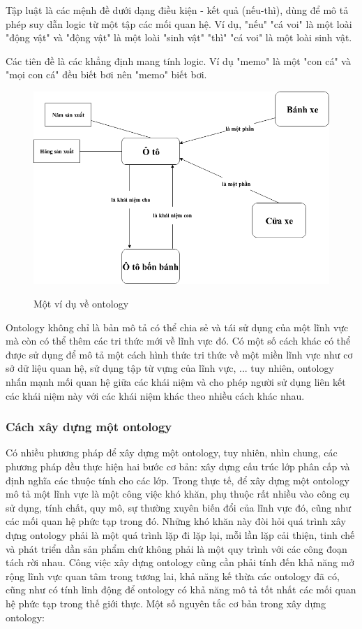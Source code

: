 Tập luật  là các mệnh đề dưới dạng điều kiện - kết quả (nếu-thì), dùng để mô tả phép suy dẫn logic từ một tập các mối quan hệ. Ví dụ, "nếu" "cá voi" là một loài "động vật"  và "động vật" là một loài "sinh vật" "thì" "cá voi" là một loài sinh vật.

Các tiên đề là các khẳng định mang tính logic. Ví dụ "memo" là một "con cá" và "mọi con cá" đều biết bơi nên "memo" biết bơi. 

\clearpage
\begin{figure}
	\center
	\includegraphics[scale=0.6]{image/otology_example}
	\label{fig:ontology}
	\caption{Một ví dụ về ontology}
\end{figure}


Ontology không chỉ là bản mô tả có thể chia sẻ và tái sử dụng của một lĩnh vực mà còn có thể thêm các tri thức mới về lĩnh vực đó. 
Có một số cách khác có thể được sử dụng để mô tả một cách hình thức tri thức về một miền lĩnh vực như cơ sở dữ liệu quan hệ, sử dụng tập từ vựng của lĩnh vực, ... tuy nhiên, ontology nhấn mạnh mối quan hệ giữa các khái niệm và cho phép người sử dụng liên kết các khái niệm này với các khái niệm khác theo nhiều cách khác nhau. 

\subsubsection{Cách xây dựng một ontology}

Có nhiều phương pháp để xây dựng một ontology, tuy nhiên, nhìn chung, các phương pháp đều thực hiện hai bước cơ bản: xây dựng cấu trúc lớp phân cấp và định nghĩa các thuộc tính cho các lớp. Trong thực tế, để xây dựng một ontology mô tả một lĩnh vực là một công việc khó khăn, phụ thuộc rất nhiều vào công cụ sử dụng, tính chất, quy mô, sự thường xuyên biến đổi của lĩnh vực đó, cũng như các mối quan hệ phức tạp trong đó. Những khó khăn này đòi hỏi quá trình xây dựng ontology phải là một quá trình lặp đi lặp lại, mỗi lần lặp cải thiện, tinh chế và phát triển dần sản phẩm chứ không phải là một quy trình với các công đoạn tách rời nhau. Công việc xây dựng ontology cũng cần phải tính đến khả năng mở rộng lĩnh vực quan tâm trong tương lai, khả năng kế thừa các ontology đã có, cũng như có tính linh động để ontology có khả năng mô tả tốt nhất các mối quan hệ phức tạp trong thế giới thực. 
Một số nguyên tắc cơ bản trong xây dựng ontology:

